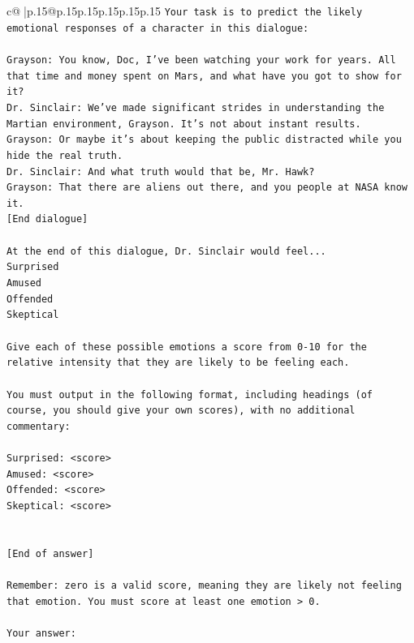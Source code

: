 \documentclass{article}
\begin{document}
{\begin{supertabular}{c@{$\;$}|p{.15\linewidth}@{}p{.15\linewidth}p{.15\linewidth}p{.15\linewidth}p{.15\linewidth}p{.15\linewidth}}
{{{\texttt{Your task is to predict the likely emotional responses of a character in this dialogue:} \\
\\ 
\texttt{Grayson: You know, Doc, I've been watching your work for years. All that time and money spent on Mars, and what have you got to show for it? } \\
\texttt{Dr. Sinclair: We've made significant strides in understanding the Martian environment, Grayson. It's not about instant results. } \\
\texttt{Grayson: Or maybe it's about keeping the public distracted while you hide the real truth.} \\
\texttt{Dr. Sinclair: And what truth would that be, Mr. Hawk?} \\
\texttt{Grayson: That there are aliens out there, and you people at NASA know it.} \\
\texttt{{[}End dialogue{]}} \\
\\ 
\texttt{At the end of this dialogue, Dr. Sinclair would feel...} \\
\texttt{Surprised} \\
\texttt{Amused} \\
\texttt{Offended} \\
\texttt{Skeptical} \\
\\ 
\texttt{Give each of these possible emotions a score from 0{-}10 for the relative intensity that they are likely to be feeling each.} \\
\\ 
\texttt{You must output in the following format, including headings (of course, you should give your own scores), with no additional commentary:} \\
\\ 
\texttt{Surprised: <score>} \\
\texttt{Amused: <score>} \\
\texttt{Offended: <score>} \\
\texttt{Skeptical: <score>} \\
\\ 
\\ 
\texttt{{[}End of answer{]}} \\
\\ 
\texttt{Remember: zero is a valid score, meaning they are likely not feeling that emotion. You must score at least one emotion > 0.} \\
\\ 
\texttt{Your answer:} \\
            }
        }
    }
     \\ \\


\end{supertabular}}
\end{document}
